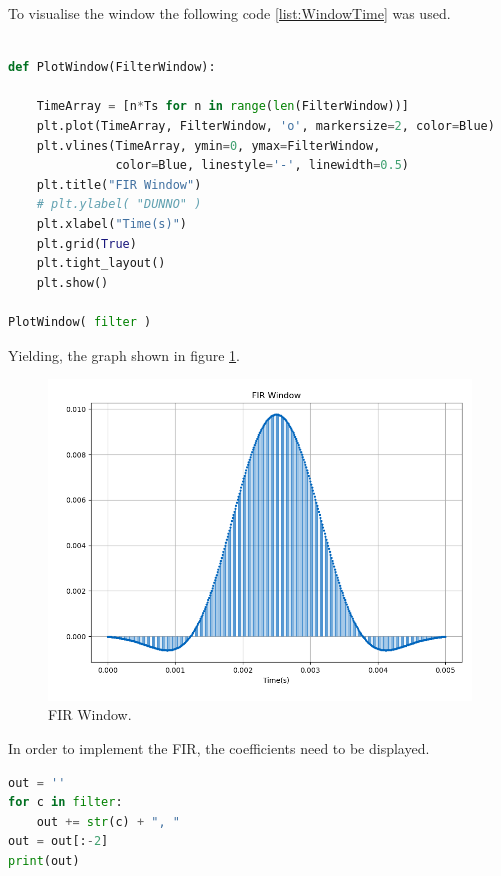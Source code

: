 To visualise the window the following code \ref{list:WindowTime} was used.

\begin{lstlisting}[language=python, caption = Specification Definition]

def PlotWindow(FilterWindow):

    TimeArray = [n*Ts for n in range(len(FilterWindow))]
    plt.plot(TimeArray, FilterWindow, 'o', markersize=2, color=Blue)
    plt.vlines(TimeArray, ymin=0, ymax=FilterWindow,
               color=Blue, linestyle='-', linewidth=0.5)
    plt.title("FIR Window")
    # plt.ylabel( "DUNNO" )
    plt.xlabel("Time(s)")
    plt.grid(True)
    plt.tight_layout()
    plt.show()

PlotWindow( filter )

\end{lstlisting}

Yielding, the graph shown in figure \ref{fig:FIRWindow}.

\begin{figure}[H]
    \centering
    \includegraphics*[scale = 0.5]{Images/FIRWindow.png}
    \caption{FIR Window.}
    \label{fig:FIRWindow}
\end{figure}

In order to implement the FIR, the coefficients need to be displayed.

\begin{lstlisting}[language=python, caption = Specification Definition]
out = ''
for c in filter:
    out += str(c) + ", "
out = out[:-2]
print(out)
\end{lstlisting}

